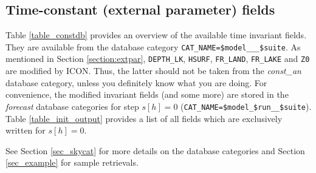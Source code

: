 

\subsection{Time-constant (external parameter) fields}

Table \ref{table_constdb} provides an overview of the available time invariant fields. They are available from the database category 
\texttt{CAT\_NAME=\$model\_\_\_\$suite}. As mentioned in Section \ref{section:extpar}, \texttt{DEPTH\_LK}, 
\texttt{HSURF}, \texttt{FR\_LAND}, \texttt{FR\_LAKE} and \texttt{Z0} are modified by ICON. Thus, the latter should not be taken from 
the \emph{const\_an} database category, unless you definitely know what you are doing. For convenience, the modified invariant fields 
(and some more) are stored in the \emph{forecast} database categories for step $s[h]=0$ 
(\texttt{CAT\_NAME=\$model\_\$run\_\_\$suite}). Table \ref{table_init_output} provides a list of all fields which are exclusively 
written for $s[h]=0$.

See Section \ref{sec_skycat} for more details on the database categories and Section \ref{sec_example} for sample retrievals.
 


